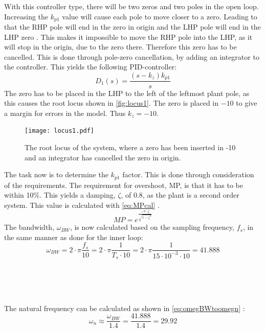 With this controller type, there will be two zeros and two poles in the open loop. Increasing the $k_{p1}$ value will cause each pole to move closer to a zero. Leading to that the RHP pole will end in the zero in origin and the LHP pole will end in the LHP zero \citep[p. 268]{sou:Feedback}. This makes it impossible to move the RHP pole into the LHP, as it will stop in the origin, due to the zero there. Therefore this zero has to be cancelled. This is done through pole-zero cancellation, by adding an integrator to the controller. This yields the following PID-controller:
\begin{equation}
D_1(s) = \frac{(s - k_z)k_{p1}}{s}
\end{equation}
The zero has to be placed in the LHP to the left of the leftmost plant pole, as this causes the root locus shown in \autoref{fig:locus1}. The zero is placed in $-10$ to give a margin for errors in the model. Thus $k_z = -10$.
\vspace{-1 cm}
\begin{figure}[H]
\centering
\texttt{[image: locus1.pdf]}
\vspace{-0.5 cm}
\caption{The root locus of the system, where a zero has been inserted in -10 and an integrator has cancelled the zero in origin.}
\label{fig:locus1}
\end{figure}
The task now is to determine the $k_{p1}$ factor. This is done through consideration of the requirements. The requirement for overshoot, MP, is that it has to be within 10\%. This yields a damping, $\zeta$, of $0.8$, as the plant is a second order system. This value is calculated with \autoref{eq:MPcal} \citep[p. 153]{sou:Feedback}.
\begin{equation}
MP = e^\frac{-\pi \cdot \zeta}{\sqrt{1 - \zeta^2}} \label{eq:MPcal}
\end{equation}
The bandwidth, $\omega_{BW}$, is now calculated based on the sampling frequency, $f_s$, in the same manner as done for the inner loop:
\begin{equation}
\omega_{BW} = 2 \cdot \pi \frac{f_s}{10} = 2 \cdot \pi \frac{1}{T_s \cdot 10} = 2 \cdot \pi \frac{1}{15 \cdot 10^{-3} \cdot 10} = 41.888
\end{equation}
\begin{where}
\\
\\
\\
\end{where}
The natural frequency can be calculated as shown in \autoref{eq:omegBWtoomegn} \citep{sou:control_slide7}:
\begin{equation}
\omega_n \approx \frac{\omega_{BW}}{1.4} = \frac{41.888}{1.4} = 29.92\label{eq:omegBWtoomegn}
\end{equation}
\begin{where}
\\
\end{where}


